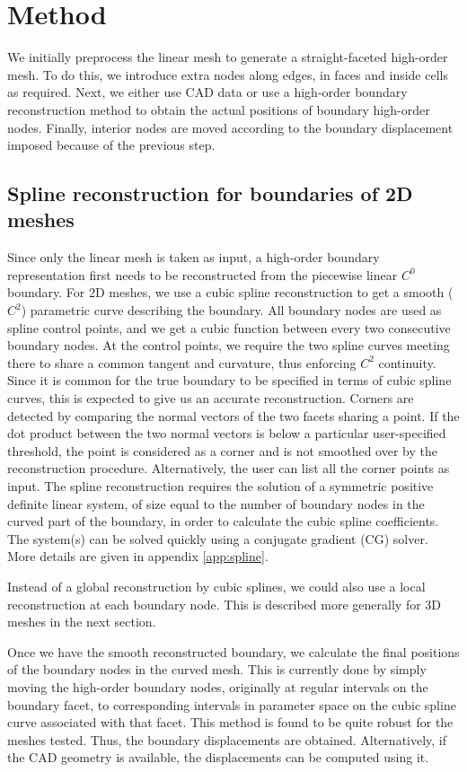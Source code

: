 \section{Method}

We initially preprocess the linear mesh to generate a straight-faceted high-order mesh. To do this, we introduce extra nodes along edges, in faces and inside cells as required. Next, we either use CAD data or use a high-order boundary reconstruction method to obtain the actual positions of boundary high-order nodes. Finally, interior nodes are moved according to the boundary displacement imposed because of the previous step.

\subsection{Spline reconstruction for boundaries of 2D meshes}
Since only the linear mesh is taken as input, a high-order boundary representation first needs to be reconstructed from the piecewise linear $C^0$ boundary. For 2D meshes, we use a cubic spline reconstruction to get a smooth ($C^2$) parametric curve describing the boundary. All boundary nodes are used as spline control points, and we get a cubic function between every two consecutive boundary nodes. At the control points, we require the two spline curves meeting there to share a common tangent and curvature, thus enforcing $C^2$ continuity. Since it is common for the true boundary to be specified in terms of cubic spline curves, this is expected to give us an accurate reconstruction. Corners are detected by comparing the normal vectors of the two facets sharing a point. If the dot product between the two normal vectors is below a particular user-specified threshold, the point is considered as a corner and is not smoothed over by the reconstruction procedure. Alternatively, the user can list all the corner points as input. The spline reconstruction requires the solution of a symmetric positive definite linear system, of size equal to the number of boundary nodes in the curved part of the boundary, in order to calculate the cubic spline coefficients. The system(s) can be solved quickly using a conjugate gradient (CG) solver. More details are given in appendix \ref{app:spline}.

Instead of a global reconstruction by cubic splines, we could also use a local reconstruction at each boundary node. This is described more generally for 3D meshes in the next section.

Once we have the smooth reconstructed boundary, we calculate the final positions of the boundary nodes in the curved mesh. This is currently done by simply moving the high-order boundary nodes, originally at regular intervals on the boundary facet, to corresponding intervals in parameter space on the cubic spline curve associated with that facet. This method is found to be quite robust for the meshes tested. Thus, the boundary displacements are obtained. Alternatively, if the CAD geometry is available, the displacements can be computed using it.

